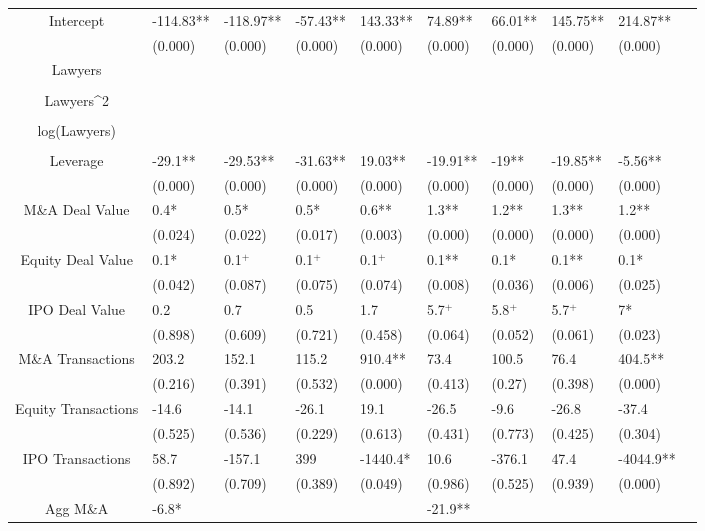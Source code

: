 \documentclass{article}
\begin{document}
\begin{table}[H]
\begin{tabular}{|clllllllll|}
Intercept & -114.83** & -118.97** & -57.43** & 143.33** & 74.89** & 66.01** & 145.75** & 214.87** & \\ 
   & (0.000) & (0.000) & (0.000) & (0.000) & (0.000) & (0.000) & (0.000) & (0.000) & \\ 
  Lawyers &  &  &  &  &  &  &  &  & \\ 
   &  &  &  &  &  &  &  &  & \\ 
  Lawyers^2 &  &  &  &  &  &  &  &  & \\ 
   &  &  &  &  &  &  &  &  & \\ 
  log(Lawyers) &  &  &  &  &  &  &  &  & \\ 
   &  &  &  &  &  &  &  &  & \\ 
  Leverage & -29.1** & -29.53** & -31.63** & 19.03** & -19.91** & -19** & -19.85** & -5.56** & \\ 
   & (0.000) & (0.000) & (0.000) & (0.000) & (0.000) & (0.000) & (0.000) & (0.000) & \\ 
  M\&A Deal Value & 0.4* & 0.5* & 0.5* & 0.6** & 1.3** & 1.2** & 1.3** & 1.2** & \\ 
   & (0.024) & (0.022) & (0.017) & (0.003) & (0.000) & (0.000) & (0.000) & (0.000) & \\ 
  Equity Deal Value & 0.1* & 0.1$^{+}$ & 0.1$^{+}$ & 0.1$^{+}$ & 0.1** & 0.1* & 0.1** & 0.1* & \\ 
   & (0.042) & (0.087) & (0.075) & (0.074) & (0.008) & (0.036) & (0.006) & (0.025) & \\ 
  IPO Deal Value & 0.2 & 0.7 & 0.5 & 1.7 & 5.7$^{+}$ & 5.8$^{+}$ & 5.7$^{+}$ & 7* & \\ 
   & (0.898) & (0.609) & (0.721) & (0.458) & (0.064) & (0.052) & (0.061) & (0.023) & \\ 
  M\&A Transactions & 203.2 & 152.1 & 115.2 & 910.4** & 73.4 & 100.5 & 76.4 & 404.5** & \\ 
   & (0.216) & (0.391) & (0.532) & (0.000) & (0.413) & (0.27) & (0.398) & (0.000) & \\ 
  Equity Transactions & -14.6 & -14.1 & -26.1 & 19.1 & -26.5 & -9.6 & -26.8 & -37.4 & \\ 
   & (0.525) & (0.536) & (0.229) & (0.613) & (0.431) & (0.773) & (0.425) & (0.304) & \\ 
  IPO Transactions & 58.7 & -157.1 & 399 & -1440.4* & 10.6 & -376.1 & 47.4 & -4044.9** & \\ 
   & (0.892) & (0.709) & (0.389) & (0.049) & (0.986) & (0.525) & (0.939) & (0.000) & \\ 
  Agg M\&A & -6.8* &  &  &  & -21.9** &  &  &  & \\ 

\end{tabular}
\end{table}
\end{document}
